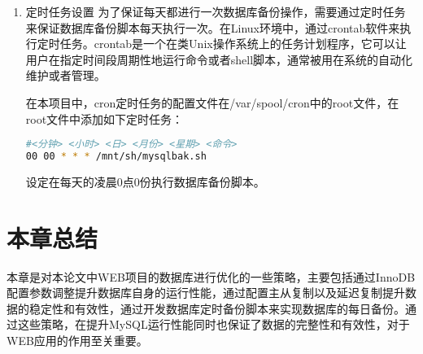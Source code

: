 \begin{enumerate}
\item 定时任务设置
为了保证每天都进行一次数据库备份操作，需要通过定时任务来保证数据库备份脚本每天执行一次。在Linux环境中，通过crontab软件来执行定时任务。crontab是一个在类Unix操作系统上的任务计划程序，它可以让用户在指定时间段周期性地运行命令或者shell脚本，通常被用在系统的自动化维护或者管理。

在本项目中，cron定时任务的配置文件在/var/spool/cron中的root文件，在root文件中添加如下定时任务：
\begin{lstlisting}[language=sh,numbers=none]
#<分钟> <小时> <日> <月份> <星期> <命令>
00 00 * * * /mnt/sh/mysqlbak.sh
\end{lstlisting}
设定在每天的凌晨0点0份执行数据库备份脚本。
\end{enumerate}
\section{本章总结}
本章是对本论文中WEB项目的数据库进行优化的一些策略，主要包括通过InnoDB配置参数调整提升数据库自身的运行性能，通过配置主从复制以及延迟复制提升数据的稳定性和有效性，通过开发数据库定时备份脚本来实现数据库的每日备份。通过这些策略，在提升MySQL运行性能同时也保证了数据的完整性和有效性，对于WEB应用的作用至关重要。